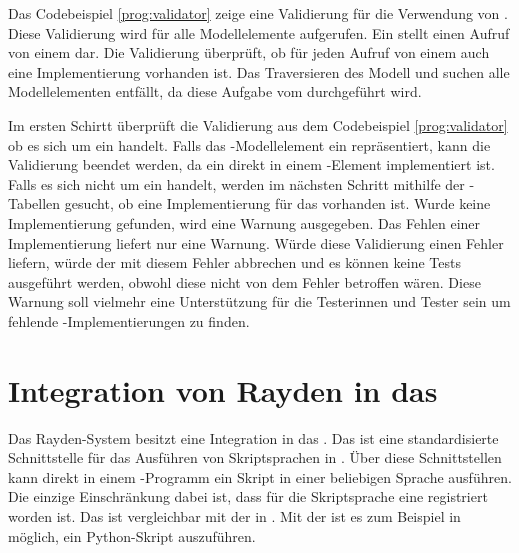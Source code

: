 \SuperPar
Das Codebeispiel \ref{prog:validator} zeige eine Validierung für die Verwendung von . Diese Validierung wird für alle  Modellelemente aufgerufen. Ein  stellt einen Aufruf von einem  dar. Die Validierung überprüft, ob für jeden Aufruf von einem  auch eine Implementierung vorhanden ist. Das Traversieren des Modell und suchen alle Modellelementen entfällt, da diese Aufgabe vom  durchgeführt wird.

\SuperPar
Im ersten Schirtt überprüft die Validierung aus dem Codebeispiel \ref{prog:validator} ob es sich um ein  handelt. Falls das -Modellelement ein  repräsentiert, kann die Validierung beendet werden, da ein  direkt in einem -Element implementiert ist. Falls es sich nicht um ein  handelt, werden im nächsten Schritt mithilfe der -Tabellen gesucht, ob eine Implementierung für das  vorhanden ist. Wurde keine Implementierung gefunden, wird eine Warnung ausgegeben. Das Fehlen einer Implementierung liefert nur eine Warnung. Würde diese Validierung einen Fehler liefern, würde der  mit diesem Fehler abbrechen und es können keine Tests ausgeführt werden, obwohl diese nicht von dem Fehler betroffen wären. Diese Warnung soll vielmehr eine Unterstützung für die Testerinnen und Tester sein um fehlende -Implementierungen zu finden.


\section{Integration von Rayden in das }
\label{cha:implementJSA}

Das Rayden-System besitzt eine Integration in das . Das  ist eine standardisierte Schnittstelle für das Ausführen von Skriptsprachen in . Über diese Schnittstellen kann direkt in einem -Programm ein Skript in einer beliebigen Sprache ausführen. Die einzige Einschränkung dabei ist, dass für die Skriptsprache eine  registriert worden ist. Das  ist vergleichbar mit der  \cite{DLR} in . Mit der  ist es zum Beispiel in  möglich, ein Python-Skript \cite{Python} auszuführen.

